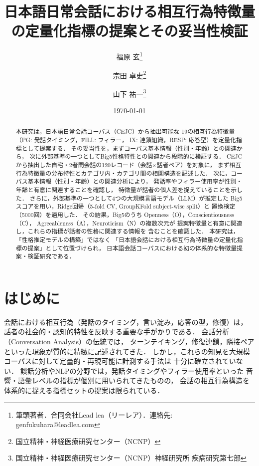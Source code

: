 \documentclass[dvipdfmx,11pt,a4paper]{bxjsarticle}
\title{日本語日常会話における相互行為特徴量の定量化指標の提案とその妥当性検証}
\author{福原 玄\thanks{筆頭著者．合同会社Lead lea（リーレア）．連絡先: genfukuhara@leadlea.com}
\and 宗田 卓史\thanks{国立精神・神経医療研究センター（NCNP）}
\and 山下 祐一\thanks{国立精神・神経医療研究センター（NCNP）神経研究所 疾病研究第七部}}
\date{\today}
\renewcommand{\_}{\paperorigunderscore\allowbreak}%
\begin{document}
\maketitle

\begin{abstract}
本研究は，日本語日常会話コーパス（CEJC）から抽出可能な
19の相互行為特徴量（PG: 発話タイミング，FILL: フィラー，
IX: 連鎖組織，RESP: 応答型）を定量化指標として提案する．
その妥当性を，まずコーパス基本情報（性別・年齢）との関連から，
次に外部基準の一つとしてBig5性格特性との関連から段階的に検証する．
CEJCから抽出した自宅・2者間会話の120レコード（会話$\times$話者ペア）を対象に，
まず相互行為特徴量の分布特性とカテゴリ内・カテゴリ間の相関構造を記述した．
次に，コーパス基本情報（性別・年齢）との関連分析により，
発話率やフィラー使用率が性別・年齢と有意に関連することを確認し，
特徴量が話者の個人差を捉えていることを示した．
さらに，外部基準の一つとして4つの大規模言語モデル（LLM）が推定した
Big5スコアを用い，Ridge回帰（5-fold CV, GroupKFold subject-wise split）と
置換検定（5000回）を適用した．
その結果，Big5のうち Openness（O），Conscientiousness（C），
Agreeableness（A），Neuroticism（N）の複数次元が
提案特徴量と有意に関連し，これらの指標が話者の性格に関連する情報を
含むことを確認した．
本研究は，「性格推定モデルの構築」ではなく
「日本語会話における相互行為特徴量の定量化指標の提案」として位置づけられ，
日本語会話コーパスにおける初の体系的な特徴量提案・検証研究である．
\end{abstract}

\section{はじめに}

会話における相互行為（発話のタイミング，言い淀み，応答の型，修復）は，
話者の社会的・認知的特性を反映する重要な手がかりである．
会話分析（Conversation Analysis）の伝統では，
ターンテイキング\cite{sacks1974}，修復連鎖\cite{schegloff1977}，隣接ペアといった現象が質的に精緻に記述されてきた．
しかし，これらの知見を大規模コーパスに対して定量的・再現可能に計測する手法は
十分に確立されていない．
談話分析やNLPの分野では，発話タイミングやフィラー使用率といった
音響・語彙レベルの指標が個別に用いられてきたものの，
会話の相互行為構造を体系的に捉える指標セットの提案は限られている．
\end{document}

